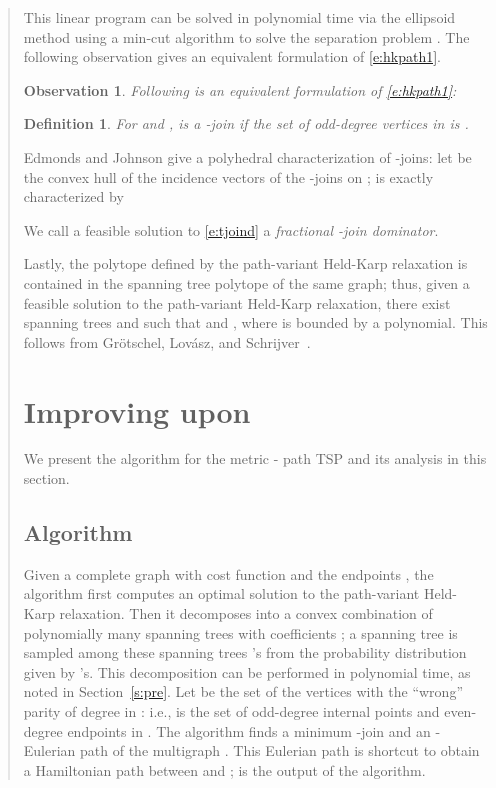 \documentclass[11pt,letterpaper]{article}
\newtheorem{defn}{Definition}
\newtheorem{obs}{Observation}
\newcommand{\st}{\mbox{-} }
\begin{document}
\begin{quote}
This linear program can be solved in polynomial time via the ellipsoid method using a min-cut algorithm to solve the separation problem \cite{GLS}. The following observation gives an equivalent formulation of \eqref{e:hkpath1}.

\begin{obs}
\label{o:hkequiv}
Following is an equivalent formulation of \eqref{e:hkpath1}:
\end{obs}

\begin{defn}
For  and ,  is a \emph{-join} if the set of odd-degree vertices in  is .
\end{defn}

Edmonds and Johnson \cite{EJ} give a polyhedral characterization of -joins: let  be the convex hull of the incidence vectors of the -joins on ;  is exactly characterized by

We call a feasible solution to \eqref{e:tjoind} a \emph{fractional -join dominator}.

Lastly, the polytope defined by the path-variant Held-Karp relaxation is contained in the spanning tree polytope of the same graph; thus, given a feasible solution  to the path-variant Held-Karp relaxation, there exist spanning trees  and  such that  and , where  is bounded by a polynomial. This follows from Gr{\"o}tschel, Lov{\'a}sz, and Schrijver~\cite{GLS}.

\section{Improving upon }\label{s:improv}

We present the algorithm for the metric \st path TSP and its analysis in this section.

\subsection{Algorithm}

Given a complete graph  with cost function  and the endpoints , the algorithm first computes an optimal solution  to the path-variant Held-Karp relaxation. Then it decomposes  into a convex combination  of polynomially many spanning trees  with coefficients ; a spanning tree  is sampled among these spanning trees 's from the probability distribution given by 's. This decomposition can be performed in polynomial time, as noted in Section~\ref{s:pre}. Let  be the set of the vertices with the ``wrong'' parity of degree in : i.e.,  is the set of odd-degree internal points and even-degree endpoints in . The algorithm finds a minimum -join  and an \st Eulerian path of the multigraph . This Eulerian path is shortcut to obtain a Hamiltonian path  between  and ;  is the output of the algorithm.


\end{quote}
\end{document}
